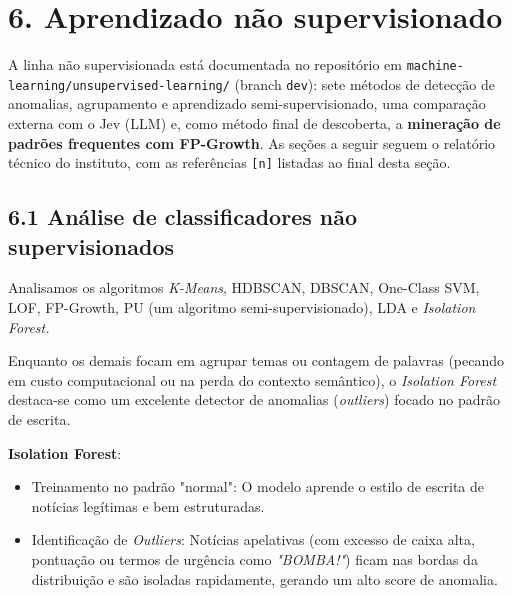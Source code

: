 \documentclass[
  brazilian,
  11pt,
]{article}
\providecommand{\tightlist}{%
  \setlength{\itemsep}{0pt}\setlength{\parskip}{0pt}}
\begin{document}
\section{6. Aprendizado não supervisionado}\label{aprendizado-nuxe3o-supervisionado}

A linha não supervisionada está documentada no repositório em \texttt{machine-learning/unsupervised-learning/} (branch \texttt{dev}): sete métodos de detecção de anomalias, agrupamento e aprendizado semi-supervisionado, uma comparação externa com o Jev (LLM) e, como método final de descoberta, a \textbf{mineração de padrões frequentes com FP-Growth}. As seções a seguir seguem o relatório técnico do instituto, com as referências \texttt{{[}n{]}} listadas ao final desta seção.

\subsection{6.1 Análise de classificadores não supervisionados}\label{anuxe1lise-de-classificadores-nuxe3o-supervisionados}

Analisamos os algoritmos \emph{K-Means}, HDBSCAN, DBSCAN, One-Class SVM, LOF, FP-Growth, PU (um algoritmo semi-supervisionado), LDA e \emph{Isolation Forest.}

Enquanto os demais focam em agrupar temas ou contagem de palavras (pecando em custo computacional ou na perda do contexto semântico), o \emph{Isolation Forest} destaca-se como um excelente detector de anomalias (\emph{outliers}) focado no padrão de escrita.

\textbf{Isolation Forest}:

\begin{itemize}
\tightlist
\item
  Treinamento no padrão "normal": O modelo aprende o estilo de escrita de notícias legítimas e bem estruturadas.
\item
  Identificação de \emph{Outliers}: Notícias apelativas (com excesso de caixa alta, pontuação ou termos de urgência como \emph{"BOMBA!"}) ficam nas bordas da distribuição e são isoladas rapidamente, gerando um alto score de anomalia.
\end{itemize}
\end{document}
